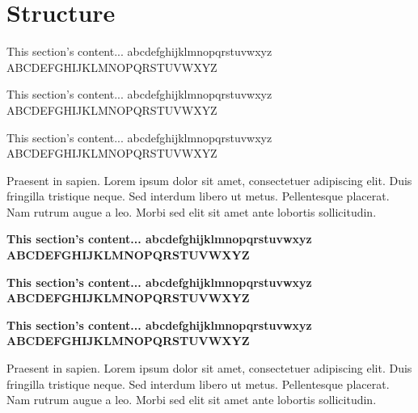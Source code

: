 \clearpage %

\section*{Structure}
\small{This section's content...\newline
abcdefghijklmnopqrstuvwxyz\newline
ABCDEFGHIJKLMNOPQRSTUVWXYZ}

\tiny{This section's content...\newline
abcdefghijklmnopqrstuvwxyz\newline
ABCDEFGHIJKLMNOPQRSTUVWXYZ}

\normalsize{This section's content...\newline
abcdefghijklmnopqrstuvwxyz\newline
ABCDEFGHIJKLMNOPQRSTUVWXYZ}

Praesent in sapien. Lorem ipsum dolor sit amet, consectetuer adipiscing elit.
Duis fringilla tristique neque. Sed interdum libero ut metus. Pellentesque placerat.
Nam rutrum augue a leo. Morbi sed elit sit amet ante lobortis sollicitudin.

\textbf{
\small{This section's content...\newline
abcdefghijklmnopqrstuvwxyz\newline
ABCDEFGHIJKLMNOPQRSTUVWXYZ}}

\textbf{
\tiny{This section's content...\newline
abcdefghijklmnopqrstuvwxyz\newline
ABCDEFGHIJKLMNOPQRSTUVWXYZ}}

\textbf{
\normalsize{This section's content...\newline
abcdefghijklmnopqrstuvwxyz\newline
ABCDEFGHIJKLMNOPQRSTUVWXYZ}}

Praesent in sapien. Lorem ipsum dolor sit amet, consectetuer adipiscing elit.
Duis fringilla tristique neque. Sed interdum libero ut metus. Pellentesque placerat.
Nam rutrum augue a leo. Morbi sed elit sit amet ante lobortis sollicitudin.

